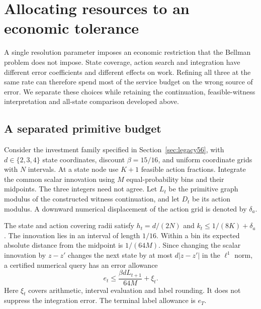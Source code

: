 \section{Allocating resources to an economic tolerance}\label{sec:resources49}
A single resolution parameter imposes an economic restriction that the Bellman problem does not impose. State coverage, action search and integration have different error coefficients and different effects on work. Refining all three at the same rate can therefore spend most of the service budget on the wrong source of error. We separate these choices while retaining the continuation, feasible-witness interpretation and all-state comparison developed above.

\subsection{A separated primitive budget}
Consider the investment family specified in Section~\ref{sec:legacy56}, with $d\in\{2,3,4\}$ state coordinates, discount $\beta=15/16$, and uniform coordinate grids with $N$ intervals. At a state node use $K+1$ feasible action fractions. Integrate the common scalar innovation using $M$ equal-probability bins and their midpoints. The three integers need not agree. Let $L_t$ be the primitive graph modulus of the constructed witness continuation, and let $D_t$ be its action modulus. A downward numerical displacement of the action grid is denoted by $\delta_a$.

The state and action covering radii satisfy $h_t=d/(2N)$ and $k_t\le 1/(8K)+\delta_a$. The innovation lies in an interval of length $1/16$. Within a bin its expected absolute distance from the midpoint is $1/(64M)$. Since changing the scalar innovation by $z-z'$ changes the next state by at most $d|z-z'|$ in the $\ell^1$ norm, a certified numerical query has an error allowance
\begin{equation}\label{eq:query49}
 e_t\le\frac{\beta d L_{t+1}}{64M}+\xi_t.
\end{equation}
Here $\xi_t$ covers arithmetic, interval evaluation and label rounding. It does not suppress the integration error. The terminal label allowance is $e_T$.

